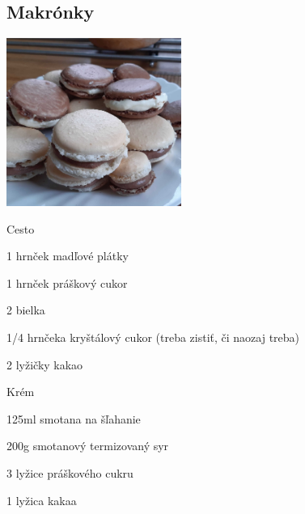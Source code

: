 \setcounter{step}{0}
\subsection{Makrónky}

\begin{ingredient}

\includegraphics[height=5.5cm]{images/makronky}

\def\portions{15}%


\begin{subingredient}{Cesto}
	\item 1 hrnček madľové plátky
	\item 1 hrnček práškový cukor
	\item 2 bielka
	\item 1/4 hrnčeka kryštálový cukor (treba zistiť, či naozaj treba)
	\item 2 lyžičky kakao
\end{subingredient}
\begin{subingredient}{Krém}
	\item 125ml smotana na šľahanie
	\item 200g smotanový termizovaný syr
	\item 3 lyžice práškového cukru
	\item 1 lyžica kakaa
\end{subingredient}

\end{ingredient}
